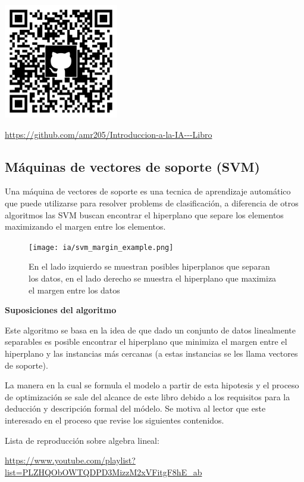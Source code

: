 \documentclass[11pt,fleqn]{book} %
\begin{document}
\includegraphics[width=5cm]{Pictures/github/libro-ia.png}

\url{https://github.com/amr205/Introduccion-a-la-IA---Libro}

\subsection{Máquinas de vectores de soporte (SVM)} 

Una máquina de vectores de soporte es una tecnica de aprendizaje automático que puede utilizarse para resolver problems de clasificación, a diferencia de otros algoritmos las SVM buscan encontrar el hiperplano que separe los elementos maximizando el margen entre los elementos.

\begin{figure}[ht]
\centering\texttt{[image: ia/svm\_margin\_example.png]}
\caption{En el lado izquierdo se muestran posibles hiperplanos que separan los datos, en el lado derecho se muestra el hiperplano que maximiza el margen entre los datos}

\label{fig:svm_example_margin} 
\end{figure}


\textbf{Suposiciones del algoritmo}

Este algoritmo se basa en la idea de que dado un conjunto de datos linealmente separables es posible encontrar el hiperplano que minimiza el margen entre el hiperplano y las instancias más cercanas (a estas instancias se les llama vectores de soporte).

La manera en la cual se formula el modelo a partir de esta hipotesis y el proceso de optimización se sale del alcance de este libro debido a los requisitos para la deducción y descripción formal del módelo. Se motiva al lector que este interesado en el proceso que revise los siguientes contenidos.

Lista de reproducción sobre algebra lineal:

\url{https://www.youtube.com/playlist?list=PLZHQObOWTQDPD3MizzM2xVFitgF8hE_ab}
\end{document}
